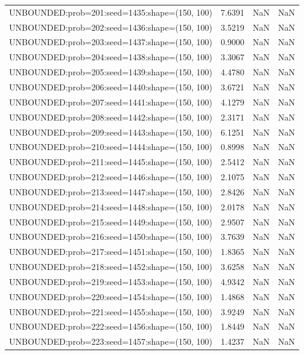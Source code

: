 \begin{longtable}{lccc}
UNBOUNDED:prob=201:seed=1435:shape=(150, 100) &  7.6391 &   NaN &    NaN \\
UNBOUNDED:prob=202:seed=1436:shape=(150, 100) &  3.5219 &   NaN &    NaN \\
UNBOUNDED:prob=203:seed=1437:shape=(150, 100) &  0.9000 &   NaN &    NaN \\
UNBOUNDED:prob=204:seed=1438:shape=(150, 100) &  3.3067 &   NaN &    NaN \\
UNBOUNDED:prob=205:seed=1439:shape=(150, 100) &  4.4780 &   NaN &    NaN \\
UNBOUNDED:prob=206:seed=1440:shape=(150, 100) &  3.6721 &   NaN &    NaN \\
UNBOUNDED:prob=207:seed=1441:shape=(150, 100) &  4.1279 &   NaN &    NaN \\
UNBOUNDED:prob=208:seed=1442:shape=(150, 100) &  2.3171 &   NaN &    NaN \\
UNBOUNDED:prob=209:seed=1443:shape=(150, 100) &  6.1251 &   NaN &    NaN \\
UNBOUNDED:prob=210:seed=1444:shape=(150, 100) &  0.8998 &   NaN &    NaN \\
UNBOUNDED:prob=211:seed=1445:shape=(150, 100) &  2.5412 &   NaN &    NaN \\
UNBOUNDED:prob=212:seed=1446:shape=(150, 100) &  2.1075 &   NaN &    NaN \\
UNBOUNDED:prob=213:seed=1447:shape=(150, 100) &  2.8426 &   NaN &    NaN \\
UNBOUNDED:prob=214:seed=1448:shape=(150, 100) &  2.0178 &   NaN &    NaN \\
UNBOUNDED:prob=215:seed=1449:shape=(150, 100) &  2.9507 &   NaN &    NaN \\
UNBOUNDED:prob=216:seed=1450:shape=(150, 100) &  3.7639 &   NaN &    NaN \\
UNBOUNDED:prob=217:seed=1451:shape=(150, 100) &  1.8365 &   NaN &    NaN \\
UNBOUNDED:prob=218:seed=1452:shape=(150, 100) &  3.6258 &   NaN &    NaN \\
UNBOUNDED:prob=219:seed=1453:shape=(150, 100) &  4.9342 &   NaN &    NaN \\
UNBOUNDED:prob=220:seed=1454:shape=(150, 100) &  1.4868 &   NaN &    NaN \\
UNBOUNDED:prob=221:seed=1455:shape=(150, 100) &  3.9249 &   NaN &    NaN \\
UNBOUNDED:prob=222:seed=1456:shape=(150, 100) &  1.8449 &   NaN &    NaN \\
UNBOUNDED:prob=223:seed=1457:shape=(150, 100) &  1.4237 &   NaN &    NaN \\

\end{longtable}
